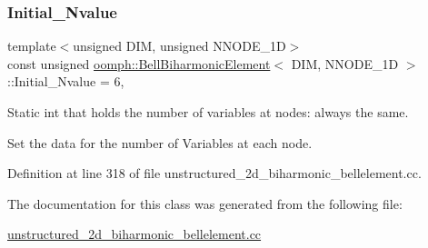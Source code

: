 \subsubsection{\texorpdfstring{Initial\+\_\+\+Nvalue}{Initial\_Nvalue}}
{\footnotesize\ttfamily template$<$unsigned D\+IM, unsigned N\+N\+O\+D\+E\+\_\+1D$>$ \\
const unsigned \hyperlink{classoomph_1_1BellBiharmonicElement}{oomph\+::\+Bell\+Biharmonic\+Element}$<$ D\+IM, N\+N\+O\+D\+E\+\_\+1D $>$\+::Initial\+\_\+\+Nvalue = 6\hspace{0.3cm}{\ttfamily [static]}, {\ttfamily [private]}}



Static int that holds the number of variables at nodes\+: always the same. 

Set the data for the number of Variables at each node. 

Definition at line 318 of file unstructured\+\_\+2d\+\_\+biharmonic\+\_\+bellelement.\+cc.



The documentation for this class was generated from the following file\+:\begin{DoxyCompactItemize}
\item 
\hyperlink{unstructured__2d__biharmonic__bellelement_8cc}{unstructured\+\_\+2d\+\_\+biharmonic\+\_\+bellelement.\+cc}\end{DoxyCompactItemize}
